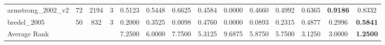 \documentclass{article}
\begin{document}
\begin{table}[!htb]
{\begin{tabular}{lccccccccccccc}
armstrong\_2002\_v2 & 72         & 2194                  & 3                  & 0.5123          & 0.5448     & 0.6625          & 0.4584    & 0.0000            & 0.4660         & 0.4992   & 0.6365       & \textbf{0.9186} & 0.8332          \\
bredel\_2005        & 50         & 832                   & 3                  & 0.2000          & 0.3525    & 0.0098          & 0.4760    & 0.0000            & 0.0893         & 0.2315   & 0.4877       & 0.2996            & \textbf{0.5841}\\
\addlinespace
\midrule
Average Rank        &          &                    &                   & 7.2500          & 6.0000  & 7.7500 & 5.3125          & 9.6875    & 5.8750            & 5.7500         & 3.1250          &  3.0000           & \textbf{1.2500}\\
\bottomrule
\end{tabular}}
\label{table:compcancer}
\end{table}
\end{document}
